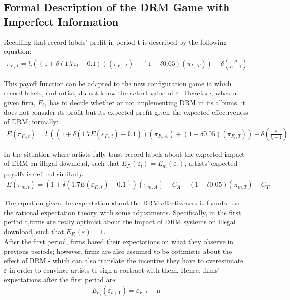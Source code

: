 \documentclass[a4paper,12pt]{article}
\numberwithin{equation}{section}
\begin{document}
\pagebreak

\subsection{Formal Description of the DRM Game with\\
Imperfect Information} \label{Sec:FullGuessingGame}

Recalling that record labels' profit in period t is described by the
following equation:
\begin{eqnarray*}
\pi_{F_{i},t}=l_{i}((1+\delta(1.7\varepsilon_{t}-0.1))(\pi_{F_{i},A})+(1-\delta0.05)(\pi_{F_{i},T}))-\delta(\frac{\rho}{l_{i}+1})
\end{eqnarray*}

This payoff function can be adapted to the new configuration game
in which record labels, and artist, do not know the actual value of
$\varepsilon$. Therefore, when a given firm, $F_{i},$ has to decide
whether or not implementing DRM in its albums, it does not consider
its profit but its expected profit given the expected effectiveness
of DRM; formally:
\begin{eqnarray*}
E(\pi_{F_{i},t})=l_{i}((1+\delta(1.7E(\varepsilon_{F_{i},t})-0.1))(\pi_{F_{i},A})+(1-\delta0.05)(\pi_{F_{i},T}))-\delta(\frac{\rho}{l_{i}+1})
\end{eqnarray*}

In the situation where artists fully trust record labels about the
expected impact of DRM on illegal download, such that $E_{F_{i}}(\varepsilon_{t})=E_{m}(\varepsilon_{t})$, artists' expected payoffs is defined similarly.
\begin{eqnarray*}
E(\pi_{m,t})=(1+\delta(1.7E(\varepsilon_{F_{i},t})-0.1))(\pi_{m,A})-C_{A}+(1-\delta0.05)(\pi_{m,T})-C_{T}
\end{eqnarray*}

The equation given the expectation about the DRM effectiveness is
founded on the rational expectation theory, with some adjustments.
Specifically, in the first period t,firms are really optimist about
the impact of DRM systems on illegal download, such that $E_{F_i}(\varepsilon)=1$.\\

After the first period, firms based their expectations on what they
observe in previous periods; however, firms are also assumed to be
optimistic about the effect of DRM - which can also translate the incentive
they have to overestimate $\varepsilon$ in order to convince artists
to sign a contract with them. Hence, firms' expectations after the
first period are:
\begin{eqnarray*}
E_{F_{i}}(\varepsilon_{t+1})=\varepsilon_{F_{i},t} + \mu
\end{eqnarray*}
\end{document}
